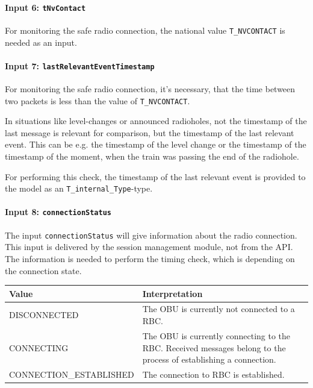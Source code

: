 \paragraph{Input 6: \texttt{tNvContact}}
For monitoring the safe radio connection, the national value \texttt{T\_NVCONTACT} is needed as an input.

\paragraph{Input 7: \texttt{lastRelevantEventTimestamp}}
For monitoring the safe radio connection, it's necessary, that the time between two packets is less than the value of \texttt{T\_NVCONTACT}.

In situations like level-changes or announced radioholes, not the timestamp of the last message is relevant for comparison, but the timestamp of the last relevant event. This can be e.g. the timestamp of the level change or the timestamp of the timestamp of the moment, when the train was passing the end of the radiohole. 

For performing this check, the timestamp of the last relevant event is provided to the model as an \texttt{T\_internal\_Type}-type.

\paragraph{Input 8: \texttt{connectionStatus}\\}
The input \texttt{connectionStatus} will give information about the radio connection. This input is delivered by the session management module, not from the API. The information is needed to perform the timing check, which is depending on the connection state.

\begin{minipage}{\linewidth}
  \begin{tabular}{| l | p{9cm} |}
    \hline
    \textbf{Value} & \textbf{Interpretation}\\ \hline
    DISCONNECTED & The OBU is currently not connected to a RBC.\\
    CONNECTING & The OBU is currently connecting to the RBC. Received messages belong to the process of establishing a connection.\\
    CONNECTION\_ESTABLISHED &  The connection to RBC is established.\\
    \hline
  \end{tabular} 
  \label{tbl:connectionStatus}
\end{minipage}

